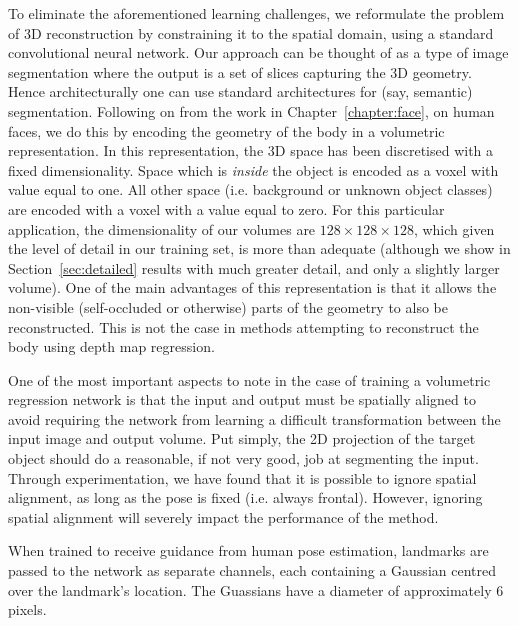 To eliminate the aforementioned learning challenges, we reformulate
the problem of 3D reconstruction by constraining it to the spatial
domain, using a standard convolutional neural network. Our approach
can be thought of as a type of image segmentation where the output is
a set of slices capturing the 3D geometry. Hence architecturally one
can use standard architectures for (say, semantic)
segmentation. Following on from the work in
Chapter~\ref{chapter:face}, on human faces, we do this by encoding the
geometry of the body in a volumetric representation. In this
representation, the 3D space has been discretised with a fixed
dimensionality. Space which is \textit{inside} the object is encoded
as a voxel with value equal to one. All other space (i.e. background
or unknown object classes) are encoded with a voxel with a value equal
to zero. For this particular application, the dimensionality of our
volumes are $128\times 128\times 128$, which given the level of detail
in our training set, is more than adequate (although we show in
Section~\ref{sec:detailed} results with much greater detail, and only
a slightly larger volume). One of the main advantages of this
representation is that it allows the non-visible (self-occluded or
otherwise) parts of the geometry to also be reconstructed. This is not
the case in methods attempting to reconstruct the body using depth map
regression.


One of the most important aspects to note in the case of training a
volumetric regression network is that the input and output must be
spatially aligned to avoid requiring the network from learning a
difficult transformation between the input image and output
volume. Put simply, the 2D projection of the target object should do a
reasonable, if not very good, job at segmenting the input. Through
experimentation, we have found that it is possible to ignore spatial
alignment, as long as the pose is fixed (i.e. always
frontal). However, ignoring spatial alignment will severely impact the
performance of the method.

When trained to receive guidance from human pose estimation, landmarks
are passed to the network as separate channels, each containing a
Gaussian centred over the landmark's location. The Guassians have a
diameter of approximately 6 pixels.

